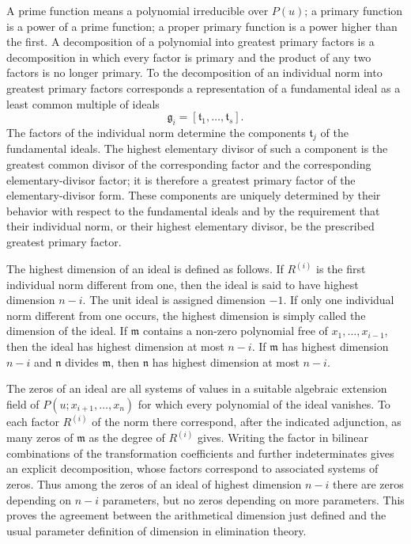 \documentclass[11pt]{article}
\begin{document}
A prime function means a polynomial irreducible over $P(u)$; a primary function is a power of a prime function; a proper primary function is a power higher than the first. A decomposition of a polynomial into greatest primary factors is a decomposition in which every factor is primary and the product of any two factors is no longer primary. To the decomposition of an individual norm into greatest primary factors corresponds a representation of a fundamental ideal as a least common multiple of ideals
\[
  \mathfrak g_i=[\mathfrak t_1,\ldots,\mathfrak t_s].
\]
The factors of the individual norm determine the components $\mathfrak t_j$ of the fundamental ideals. The highest elementary divisor of such a component is the greatest common divisor of the corresponding factor and the corresponding elementary-divisor factor; it is therefore a greatest primary factor of the elementary-divisor form. These components are uniquely determined by their behavior with respect to the fundamental ideals and by the requirement that their individual norm, or their highest elementary divisor, be the prescribed greatest primary factor.

The highest dimension of an ideal is defined as follows. If $R^{(i)}$ is the first individual norm different from one, then the ideal is said to have highest dimension $n-i$. The unit ideal is assigned dimension $-1$. If only one individual norm different from one occurs, the highest dimension is simply called the dimension of the ideal. If $\mathfrak m$ contains a non-zero polynomial free of $x_1,\ldots,x_{i-1}$, then the ideal has highest dimension at most $n-i$. If $\mathfrak m$ has highest dimension $n-i$ and $\mathfrak n$ divides $\mathfrak m$, then $\mathfrak n$ has highest dimension at most $n-i$.

The zeros of an ideal are all systems of values in a suitable algebraic extension field of $P(u;x_{i+1},\ldots,x_n)$ for which every polynomial of the ideal vanishes. To each factor $R^{(i)}$ of the norm there correspond, after the indicated adjunction, as many zeros of $\mathfrak m$ as the degree of $R^{(i)}$ gives. Writing the factor in bilinear combinations of the transformation coefficients and further indeterminates gives an explicit decomposition, whose factors correspond to associated systems of zeros. Thus among the zeros of an ideal of highest dimension $n-i$ there are zeros depending on $n-i$ parameters, but no zeros depending on more parameters. This proves the agreement between the arithmetical dimension just defined and the usual parameter definition of dimension in elimination theory.
\end{document}
